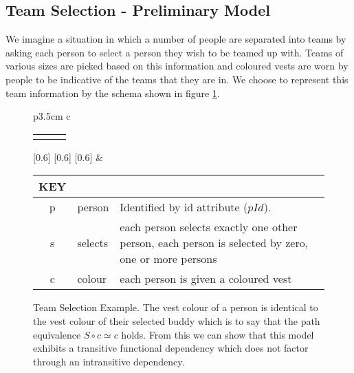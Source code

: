 \subsection{Team Selection - Preliminary Model}

We imagine a situation in which a number of people are separated into teams by asking each person to select a person they wish to be teamed up with. Teams of various sizes are picked based on this information and coloured vests are worn by people to be indicative of the teams that they are in.
We choose to represent this team information by the schema shown in figure \ref{teamselectionpreliminaryERschema}. 

\begin{figure} [h]
\begin{center}
\begin{tabular}{p{3.5cm} c}
\begin{tabular}{c p{1.5cm} c}
   \Rnode{p}{p} & & \Rnode{v}{v}
\end{tabular}
[0.6]
[0.6]
[0.6]
\idcomp
& \footnotesize
\begin{tabular}{c p{1.5cm} p{4cm}}
KEY && \\
\hline
p & person & Identified by id attribute ($pId$). \\
s & selects & each person selects exactly one other person, each person is selected by zero, one or more persons\\
c & colour & each person is given a coloured vest 
\end{tabular} 
\end{tabular}
\end{center}
\caption{Team Selection Example. The  vest colour  of a person is 
identical to the vest colour of their selected buddy which is to say that the path equivalence $S \circ c \simeq c$ holds. From this
we can show that this model exhibits a transitive functional dependency which does not factor through an intransitive dependency.
}
\label{teamselectionpreliminaryERschema}
\end{figure}


